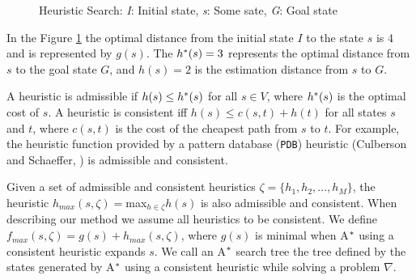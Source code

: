 \begin{figure}[htb]
\centering
{}
\caption{Heuristic Search: \textit{I}: Initial state, \textit{s}: Some sate, \textit{G}: Goal state} \label{fig:searchSpace}
\end{figure}

In the Figure \ref{fig:searchSpace} the optimal distance from the initial state $I$ to  the state $s$ is 4 and is represented by $g(s)$. The $h\sp{*}(s) = 3$ represents the optimal distance from $s$ to the goal state $G$, and $h(s) = 2$ is the estimation distance from $s$ to $G$.

A heuristic is admissible if $h(s) \leq h\sp{*}(s)$ for all $s \in V$, where $h\sp{*}(s)$ is the optimal cost of $s$. A heuristic is consistent iff $h(s) \leq c(s,t) + h(t)$ for all states $s$ and $t$, where $c(s,t)$ is the cost of the cheapest path from $s$ to $t$. For example, the heuristic function provided by a pattern database (\texttt{PDB}) heuristic (Culberson and Schaeffer, \citeyear{culberson1998pattern}) is admissible and consistent.

Given a set of admissible and consistent heuristics $\zeta = \{h_{1}, h_{2}, \dots, h_{M}\}$, the heuristic $h_{max}(s,\zeta) = $max$_{h \in \zeta} h(s)$ is also admissible and consistent. When describing our method we assume all heuristics to be consistent. We define $f_{max}(s, \zeta) = g(s) + h_{max}(s, \zeta)$, where $g(s)$ is minimal when A$\sp{*}$ using a consistent heuristic expands $s$. We call an A$\sp{*}$ search tree the tree defined by the states generated by A$\sp{*}$ using a consistent heuristic while solving a problem $\nabla$.

